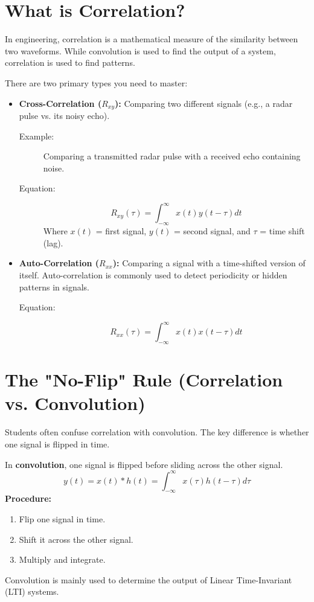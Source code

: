 \documentclass[12pt,a4paper]{article}
\begin{document}

\section*{What is Correlation?}
In engineering, correlation is a mathematical measure of the similarity between two waveforms. While convolution is used to find the output of a system, correlation is used to find patterns.

There are two primary types you need to master:
\begin{itemize}
    \item \textbf{Cross-Correlation ($R_{xy}$):} Comparing two different signals (e.g., a radar pulse vs. its noisy echo).
    \begin{description}
        \item[Example:] Comparing a transmitted radar pulse with a received echo containing noise.
        \item[Equation:] 
        \[ R_{xy}(\tau) = \int_{-\infty}^{\infty} x(t) y(t-\tau) dt \]
        Where $x(t)$ = first signal, $y(t)$ = second signal, and $\tau$ = time shift (lag).
    \end{description}

    \item \textbf{Auto-Correlation ($R_{xx}$):} Comparing a signal with a time-shifted version of itself. Auto-correlation is commonly used to detect periodicity or hidden patterns in signals.
    \begin{description}
        \item[Equation:] 
        \[ R_{xx}(\tau) = \int_{-\infty}^{\infty} x(t) x(t-\tau) dt \]
    \end{description}
\end{itemize}

\section*{The "No-Flip" Rule (Correlation vs. Convolution)}
Students often confuse correlation with convolution. The key difference is whether one signal is flipped in time.

In \textbf{convolution}, one signal is flipped before sliding across the other signal.
\[ y(t) = x(t) * h(t) = \int_{-\infty}^{\infty} x(\tau) h(t-\tau) d\tau \]
\textbf{Procedure:}
\begin{enumerate}
    \item Flip one signal in time.
    \item Shift it across the other signal.
    \item Multiply and integrate.
\end{enumerate}
Convolution is mainly used to determine the output of Linear Time-Invariant (LTI) systems.
\end{document}
